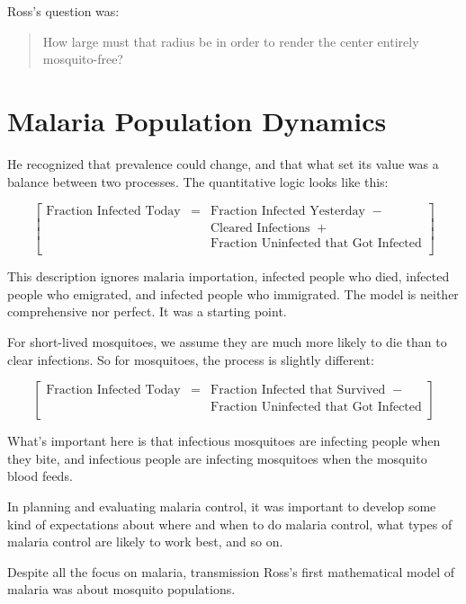 \documentclass[
]{book}
\begin{document}
Ross's question was:

\begin{quote}
How large must that radius be in order to render the center entirely mosquito-free?
\end{quote}

\section{Malaria Population Dynamics}\label{malaria-population-dynamics}

He recognized that prevalence could change, and that what set its value was a balance between two processes. The quantitative logic looks like this:

\[
\left[
\begin{array}{rcl}
\mbox{Fraction Infected Today} &=& \mbox{Fraction Infected Yesterday} \;\; -\\
&& \mbox{Cleared Infections} \;\; + \\
&& \mbox{Fraction Uninfected that Got Infected}\\
\end{array} \right]
\]

This description ignores malaria importation, infected people who died, infected people who emigrated, and infected people who immigrated. The model is neither comprehensive nor perfect. It was a starting point.

For short-lived mosquitoes, we assume they are much more likely to die than to clear infections. So for mosquitoes, the process is slightly different:

\[
\left[
\begin{array}{rcl}
\mbox{Fraction Infected Today} &=& \mbox{Fraction Infected that Survived} \;\; -\\
&& \mbox{Fraction Uninfected that Got Infected}\\
\end{array} \right]
\]

What's important here is that infectious mosquitoes are infecting people when they bite, and infectious people are infecting mosquitoes when the mosquito blood feeds.

In planning and evaluating malaria control, it was important to develop some kind of expectations about where and when to do malaria control, what types of malaria control are likely to work best, and so on.

Despite all the focus on malaria, transmission Ross's first mathematical model of malaria was about mosquito populations.
\end{document}
